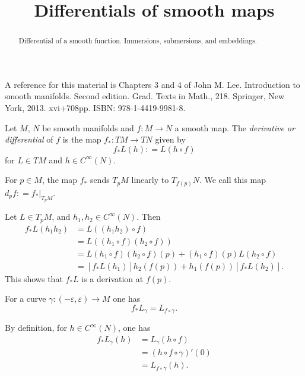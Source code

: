 \documentclass{ximera}
\title{Differentials of smooth maps}
\begin{document}
    \begin{abstract}  Differential of a smooth function. Immersions, submersions, and embeddings.   \end{abstract}
    \maketitle

        A reference for this material is Chapters 3 and 4  of John M. Lee. Introduction to smooth manifolds. Second edition. Grad. Texts in Math., 218. Springer, New York, 2013. xvi+708pp. ISBN: 978-1-4419-9981-8.

    \begin{definition}
        Let $M$, $N$ be smooth manifolds and $f : M \to N$ a smooth map. The \emph{derivative or differential} of $f$ is the map $f_{\ast} : TM \to TN$ given by
        \[      f_{\ast} L (h) : = L (h \circ f )                          \]
        for $L \in TM$ and $h \in C^{\infty}(N)$. 
    \end{definition}

    \begin{proposition}
        For $p\in M$, the map $f_{\ast} $ sends $T_pM$ linearly to $T_{f(p)}N$. We call this map $d_pf : = f_{\ast} \vert _{T_pM}$. 
    \begin{solution}
        Let $L \in T_pM$, and $h_1, h_2 \in C^{\infty} (N)$. Then 
        \begin{align*}
            f_{\ast} L (h_1h_2) & = L ( (h_1 h_2 ) \circ f ) \\
            & = L ( (h_1 \circ f) (h_2 \circ f) )\\
            & = L(  h_1 \circ f ) ( h_ 2 \circ f  ) (p) + ( h_ 1 \circ f  ) (p) L(  h_2 \circ f ) \\
            & = [ f_{\ast} L(h_1)] h_2 (f(p)) + h_1 (f(p)) [f_{\ast} L (h_2)].
        \end{align*}
        This shows that $f_{\ast} L$ is a derivation at $f(p)$.
    \end{solution} 
    \end{proposition}

    \begin{proposition}
        For a curve $\gamma : (- \varepsilon , \varepsilon ) \to M$  one has 
        \[   f_{\ast} L_{\gamma} = L_{ f \circ \gamma }  .  \]
    \begin{solution}
        By definition, for $h \in C^{\infty}(N)$, one has
        \begin{align*}
            f_{\ast} L_{\gamma} (h) & =  L_{\gamma} (  h \circ f  )  \\
            & = ( h \circ f \circ \gamma )' (0) \\
            & = L_{f \circ \gamma } (h) .
        \end{align*}
    \end{solution}
\end{proposition}
    
\end{document}
